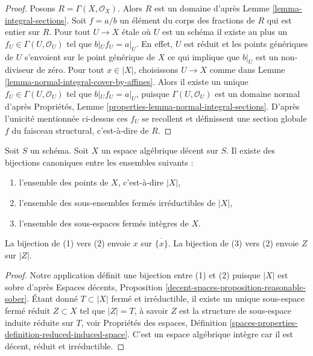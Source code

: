 \begin{proof}
Posons $R = \Gamma(X, \mathcal{O}_X)$. Alors $R$ est un domaine d'après
Lemme \ref{lemma-integral-sections}.
Soit $f = a/b$ un élément du corps des fractions de $R$
qui est entier sur $R$.
Pour tout $U \to X$ \'etale où $U$ est un schéma il existe au plus un
$f_U \in \Gamma(U, \mathcal{O}_U)$ tel que $b|_U f_U = a|_U$.
En effet, $U$ est réduit et les points génériques de $U$ s'envoient sur
le point générique de $X$ ce qui implique que $b|_U$ est un
non-diviseur de zéro.
Pour tout $x \in |X|$, choisissons $U \to X$ comme dans
Lemme \ref{lemma-normal-integral-cover-by-affines}.
Alors il existe un unique $f_U \in \Gamma(U, \mathcal{O}_U)$
tel que $b|_U f_U = a|_U$, puisque
$\Gamma(U, \mathcal{O}_U)$ est un domaine normal d'après
Propriétés, Lemme \ref{properties-lemma-normal-integral-sections}.
D'après l'unicité mentionnée ci-dessus ces $f_U$
se recollent et définissent une section globale $f$ du faisceau
structural, c'est-à-dire de $R$.
\end{proof}

\begin{lemma}
\label{lemma-decent-irreducible-closed}
Soit $S$ un schéma. Soit $X$ un espace algébrique décent sur $S$.
Il existe des bijections canoniques entre les ensembles suivants :
\begin{enumerate}
\item l'ensemble des points de $X$, c'est-à-dire $|X|$,
\item l'ensemble des sous-ensembles fermés irréductibles de $|X|$,
\item l'ensemble des sous-espaces fermés intègres de $X$.
\end{enumerate}
La bijection de (1) vers (2) envoie $x$ sur $\overline{\{x\}}$.
La bijection de (3) vers (2) envoie $Z$ sur $|Z|$.
\end{lemma}

\begin{proof}
Notre application définit une bijection entre (1) et (2) puisque $|X|$ est
sobre d'après 
Espaces décents, Proposition \ref{decent-spaces-proposition-reasonable-sober}.
Étant donné $T \subset |X|$ fermé et irréductible, il existe un
unique sous-espace fermé réduit $Z \subset X$ tel que
$|Z| = T$, à savoir $Z$ est la structure de sous-espace induite
réduite sur $T$, voir Propriétés des espaces, Définition
\ref{spaces-properties-definition-reduced-induced-space}.
C'est un espace algébrique intègre car il est décent,
réduit et irréductible.
\end{proof}






